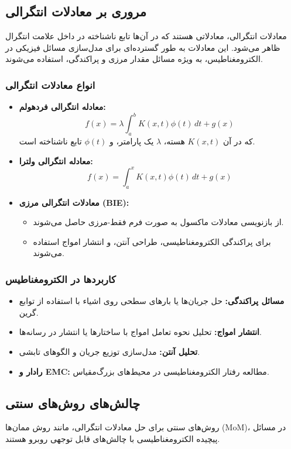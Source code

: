 \documentclass[12pt,a4paper]{article}
\begin{document}
\subsection{مروری بر معادلات انتگرالی}
معادلات انتگرالی، معادلاتی هستند که در آن‌ها تابع ناشناخته در داخل علامت انتگرال ظاهر می‌شود. این معادلات به طور گسترده‌ای برای مدل‌سازی مسائل فیزیکی در الکترومغناطیس، به ویژه مسائل مقدار مرزی و پراکندگی، استفاده می‌شوند.

\subsubsection{انواع معادلات انتگرالی}
\begin{itemize}
    \item \textbf{معادله انتگرالی فردهولم:}
          \[
              f(x) = \lambda \int_a^b K(x, t)\phi(t) \,dt + g(x)
          \]
          که در آن \(K(x, t)\) هسته، \(\lambda\) یک پارامتر، و \(\phi(t)\) تابع ناشناخته است.
    \item \textbf{معادله انتگرالی ولترا:}
          \[
              f(x) = \int_a^x K(x, t)\phi(t) \,dt + g(x)
          \]
    \item \textbf{معادلات انتگرالی مرزی (BIE):}
          \begin{itemize}
              \item از بازنویسی معادلات ماکسول به صورت فرم فقط-مرزی حاصل می‌شوند.
              \item برای پراکندگی الکترومغناطیسی، طراحی آنتن، و انتشار امواج استفاده می‌شوند.
          \end{itemize}
\end{itemize}

\subsubsection{کاربردها در الکترومغناطیس}
\begin{itemize}
    \item \textbf{مسائل پراکندگی:} حل جریان‌ها یا بارهای سطحی روی اشیاء با استفاده از توابع گرین.
    \item \textbf{انتشار امواج:} تحلیل نحوه تعامل امواج با ساختارها یا انتشار در رسانه‌ها.
    \item \textbf{تحلیل آنتن:} مدل‌سازی توزیع جریان و الگوهای تابشی.
    \item \textbf{رادار و EMC:} مطالعه رفتار الکترومغناطیسی در محیط‌های بزرگ‌مقیاس.
\end{itemize}

\subsection{چالش‌های روش‌های سنتی}
روش‌های سنتی برای حل معادلات انتگرالی، مانند روش ممان‌ها (MoM)، در مسائل پیچیده الکترومغناطیسی با چالش‌های قابل توجهی روبرو هستند.
\end{document}
